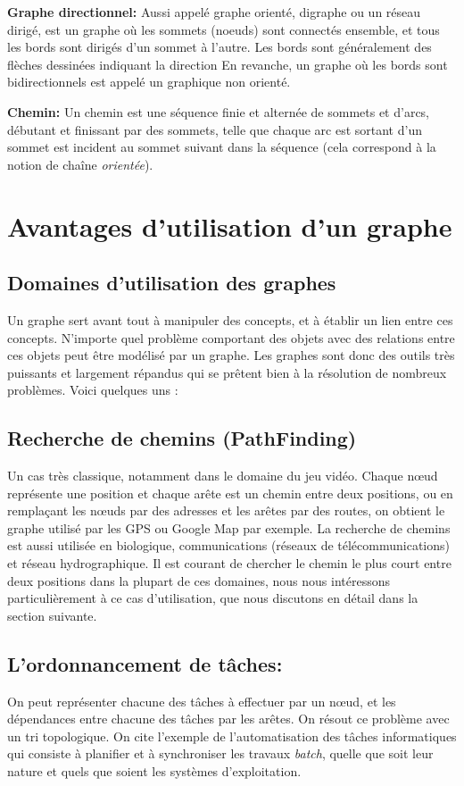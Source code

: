\textbf{Graphe directionnel:} Aussi appelé graphe orienté, digraphe ou un réseau dirigé, est un graphe où les sommets (noeuds) sont connectés ensemble, et tous les bords sont dirigés d'un sommet à l'autre. Les bords sont généralement des flèches dessinées indiquant la direction En revanche, un graphe où les bords sont bidirectionnels est appelé un graphique non orienté.

\textbf{Chemin:} Un chemin est une séquence finie et alternée de sommets et d'arcs, débutant et finissant par des sommets, telle que chaque arc est sortant d'un sommet est incident au sommet suivant dans la séquence (cela correspond à la notion de chaîne \emph{orientée}).

	
	
\section{Avantages d'utilisation d'un graphe}
\subsection{Domaines d'utilisation des graphes}
Un graphe sert avant tout à manipuler des concepts, et à établir un lien entre ces concepts. N'importe quel problème comportant des objets avec des relations entre ces objets peut être modélisé par un graphe.
Les graphes sont donc des outils très puissants et largement répandus qui se prêtent bien à la résolution de nombreux problèmes. Voici quelques uns :

\subsection{Recherche de chemins (PathFinding)}
Un cas très classique, notamment dans le domaine du jeu vidéo. Chaque nœud représente une position et chaque arête est un chemin entre deux positions, ou en remplaçant les nœuds par des adresses et les arêtes par des routes, on obtient le graphe utilisé par les GPS ou Google Map par exemple.
La recherche de chemins est aussi utilisée en biologique, communications (réseaux de télécommunications) et réseau hydrographique.
Il est courant de chercher le chemin le plus court entre deux positions dans la plupart de ces domaines, nous nous intéressons particulièrement à ce cas d'utilisation, que nous discutons en détail dans la section suivante.


\subsection{L'ordonnancement de tâches:}
On peut représenter chacune des tâches à effectuer par un nœud, et les dépendances entre chacune des tâches par les arêtes. On résout ce problème avec un tri topologique.
On cite l'exemple de l'automatisation des tâches informatiques qui consiste à planifier et à synchroniser les travaux \emph{batch}, quelle que soit leur nature et quels que soient les systèmes d'exploitation.

